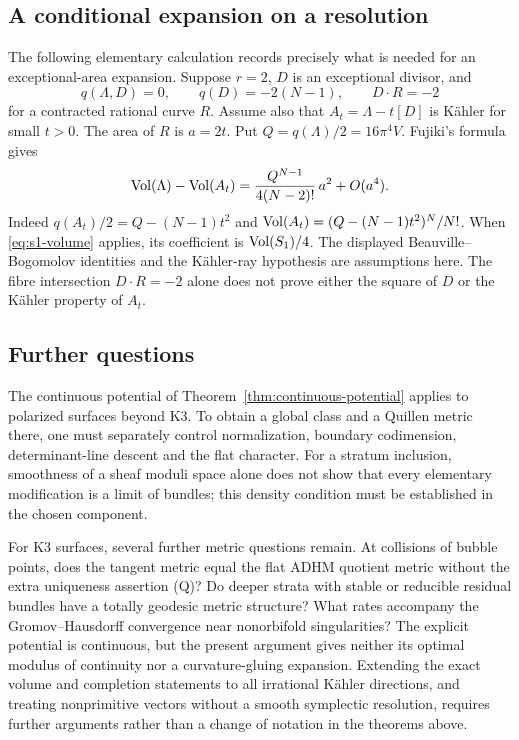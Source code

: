 \subsection{A conditional expansion on a resolution}
The following elementary calculation records precisely what is needed
for an exceptional-area expansion. Suppose $r=2$, $D$ is an exceptional
divisor, and
\[
 q(\Lambda,D)=0,\qquad q(D)=-2(N-1),\qquad D\cdot R=-2
\]
for a contracted rational curve $R$.
Assume also that $A_t=\Lambda-t[D]$ is K\"ahler for small $t>0$.
The area of $R$ is $a=2t$. Put $Q=q(\Lambda)/2=16\pi^4V$.
Fujiki's formula gives
\begin{equation}\label{eq:resolution-volume}
 \operatorname{Vol}(\Lambda)-\operatorname{Vol}(A_t)
 =\frac{Q^{N-1}}{4(N-2)!}\,a^2+O(a^4).
\end{equation}
Indeed $q(A_t)/2=Q-(N-1)t^2$ and
$\operatorname{Vol}(A_t)=(Q-(N-1)t^2)^N/N!$.
When \eqref{eq:s1-volume} applies, its coefficient is
$\operatorname{Vol}(S_1)/4$. The displayed Beauville--Bogomolov identities and the
K\"ahler-ray hypothesis are assumptions here. The fibre intersection
$D\cdot R=-2$ alone does not prove either the square of $D$ or the
K\"ahler property of $A_t$.

\subsection{Further questions}
The continuous potential of Theorem~\ref{thm:continuous-potential} applies
to polarized surfaces beyond K3. To obtain a global class and a Quillen
metric there, one must separately control normalization, boundary
codimension, determinant-line descent and the flat character.
For a stratum inclusion, smoothness of a sheaf moduli space alone does
not show that every elementary modification is a limit of bundles;
this density condition must be established in the chosen component.

For K3 surfaces, several further metric questions remain.
At collisions of bubble points, does the tangent metric equal the flat
ADHM quotient metric without the extra uniqueness assertion
\textup{(Q)}? Do deeper strata with stable or reducible residual bundles
have a totally geodesic metric structure? What rates accompany the
Gromov--Hausdorff convergence near nonorbifold singularities?
The explicit potential is continuous, but the present argument gives
neither its optimal modulus of continuity nor a curvature-gluing expansion.
Extending the exact volume and completion statements to all irrational
K\"ahler directions, and treating nonprimitive vectors without a smooth
symplectic resolution, requires further arguments rather than a change
of notation in the theorems above.
